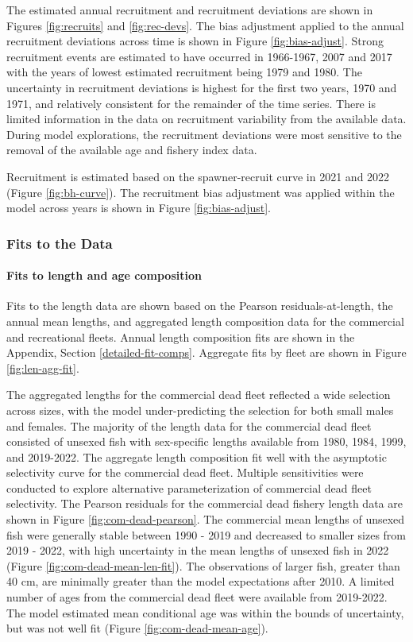 \documentclass[11pt,
  letterpaper,
]{article}
\begin{document}
The estimated annual recruitment and recruitment deviations are shown in Figures \ref{fig:recruits} and \ref{fig:rec-devs}. The bias adjustment applied to the annual recruitment deviations across time is shown in Figure \ref{fig:bias-adjust}. Strong recruitment events are estimated to have occurred in 1966-1967, 2007 and 2017 with the years of lowest estimated recruitment being 1979 and 1980. The uncertainty in recruitment deviations is highest for the first two years, 1970 and 1971, and relatively consistent for the remainder of the time series. There is limited information in the data on recruitment variability from the available data. During model explorations, the recruitment deviations were most sensitive to the removal of the available age and fishery index data.

Recruitment is estimated based on the spawner-recruit curve in 2021 and 2022 (Figure \ref{fig:bh-curve}). The recruitment bias adjustment was applied within the model across years is shown in Figure \ref{fig:bias-adjust}.

\subsubsection{Fits to the Data}\label{fits-to-the-data}

\paragraph{Fits to length and age composition}\label{fits-to-length-and-age-composition}

Fits to the length data are shown based on the Pearson residuals-at-length, the annual mean lengths, and aggregated length composition data for the commercial and recreational fleets. Annual length composition fits are shown in the Appendix, Section \ref{detailed-fit-comps}. Aggregate fits by fleet are shown in Figure \ref{fig:len-agg-fit}.

The aggregated lengths for the commercial dead fleet reflected a wide selection across sizes, with the model under-predicting the selection for both small males and females. The majority of the length data for the commercial dead fleet consisted of unsexed fish with sex-specific lengths available from 1980, 1984, 1999, and 2019-2022. The aggregate length composition fit well with the asymptotic selectivity curve for the commercial dead fleet. Multiple sensitivities were conducted to explore alternative parameterization of commercial dead fleet selectivity. The Pearson residuals for the commercial dead fishery length data are shown in Figure \ref{fig:com-dead-pearson}. The commercial mean lengths of unsexed fish were generally stable between 1990 - 2019 and decreased to smaller sizes from 2019 - 2022, with high uncertainty in the mean lengths of unsexed fish in 2022 (Figure \ref{fig:com-dead-mean-len-fit}). The observations of larger fish, greater than 40 cm, are minimally greater than the model expectations after 2010. A limited number of ages from the commercial dead fleet were available from 2019-2022. The model estimated mean conditional age was within the bounds of uncertainty, but was not well fit (Figure \ref{fig:com-dead-mean-age}).
\end{document}
